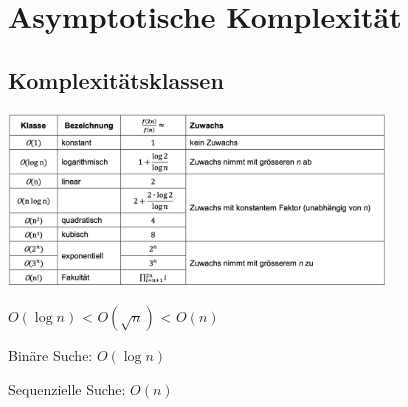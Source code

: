 \section*{Asymptotische Komplexität}
\subsection*{Komplexitätsklassen}
\begin{center}
	\includegraphics[width=10cm]{images/asympklassen}
\end{center}

$O(\log{}n)$ < $O(\sqrt{n})$ < $O(n)$

Binäre Suche: $O(\log{}n)$ %

Sequenzielle Suche: $O(n)$ %
